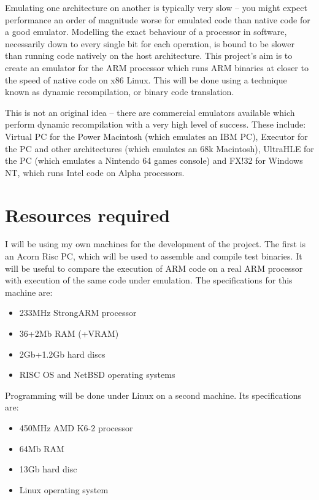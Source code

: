 Emulating one architecture on another is typically very slow -- you might expect performance an order of magnitude worse for emulated code than native code for a good emulator. Modelling the exact behaviour of a processor in software, necessarily down to every single bit for each operation, is bound to be slower than running code natively on the host architecture. This project's aim is to create an emulator for the ARM processor which runs ARM binaries at closer to the speed of native code on x86 Linux. This will be done using a technique known as dynamic recompilation, or binary code translation.

This is not an original idea -- there are commercial emulators available which perform dynamic recompilation with a very high level of success. These include: Virtual PC for the Power Macintosh (which emulates an IBM PC), Executor for the PC and other architectures (which emulates an 68k Macintosh), UltraHLE for the PC (which emulates a Nintendo 64 games console) and FX!32 for Windows NT, which runs Intel code on Alpha processors.

\section*{Resources required}

I will be using my own machines for the development of the project. The first is an Acorn Risc PC, which will be used to assemble and compile test binaries. It will be useful to compare the execution of ARM code on a real ARM processor with execution of the same code under emulation. The specifications for this machine are:

\begin{itemize}

\item 233MHz StrongARM processor
\item 36+2Mb RAM (+VRAM)
\item 2Gb+1.2Gb hard discs
\item RISC OS and NetBSD operating systems

\end{itemize}

Programming will be done under Linux on a second machine. Its specifications are:

\begin{itemize}

\item 450MHz AMD K6-2 processor
\item 64Mb RAM
\item 13Gb hard disc
\item Linux operating system

\end{itemize}

